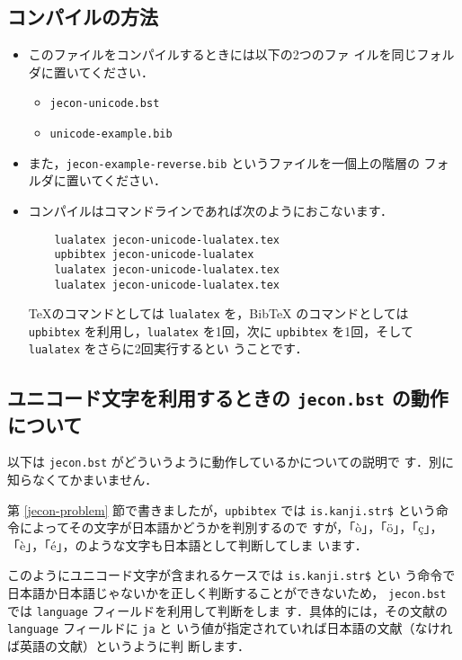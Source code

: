 \documentclass[article]{jlreq}
\begin{document}
\subsection{コンパイルの方法}

\begin{itemize}
 \item このファイルをコンパイルするときには以下の2つのファ
       イルを同じフォルダに置いてください．
       \begin{itemize}
        \item \texttt{jecon-unicode.bst}
        \item \texttt{unicode-example.bib}
       \end{itemize}
 \item また，\texttt{jecon-example-reverse.bib} というファイルを一個上の階層の
       フォルダに置いてください．
 \item コンパイルはコマンドラインであれば次のようにおこないます．
\begin{verbatim}
    lualatex jecon-unicode-lualatex.tex
    upbibtex jecon-unicode-lualatex
    lualatex jecon-unicode-lualatex.tex               
    lualatex jecon-unicode-lualatex.tex
\end{verbatim}
       \TeX のコマンドとしては \texttt{lualatex} を，BibTeX のコマンドとしては
       \texttt{upbibtex} を利用し，\texttt{lualatex} を1回，次に
       \texttt{upbibtex} を1回，そして \texttt{lualatex} をさらに2回実行するとい
       うことです．
\end{itemize}

\subsection{ユニコード文字を利用するときの \texttt{jecon.bst} の動作について}

以下は \texttt{jecon.bst} がどういうように動作しているかについての説明で
す．別に知らなくてかまいません．

\vspace*{1em}

第 \ref{jecon-problem} 節で書きましたが，\texttt{upbibtex} では
\texttt{is.kanji.str\$} という命令によってその文字が日本語かどうかを判別するので
すが，「ò」，「ö」，「ç」，「è」，「é」，のような文字も日本語として判断してしま
います．

このようにユニコード文字が含まれるケースでは \texttt{is.kanji.str\$} とい
う命令で日本語か日本語じゃないかを正しく判断することができないため，
\texttt{jecon.bst} では \texttt{language} フィールドを利用して判断をしま
す．具体的には，その文献の \texttt{language} フィールドに \texttt{ja} と
いう値が指定されていれば日本語の文献（なければ英語の文献）というように判
断します．
\end{document}
